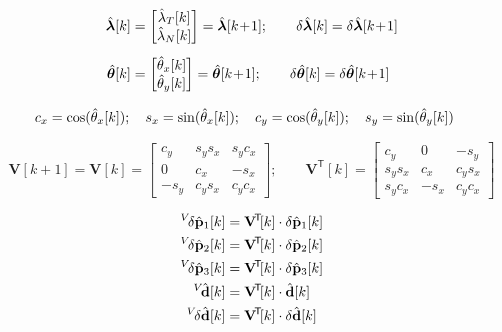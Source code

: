 \documentclass[UTF8,11pt,a4paper]{ctexart}
\newcommand{\tp}{^{\!\mathsf{T}}}
\newcommand{\Vk}{\mathbf{V}[k]}
\newcommand{\VkT}{\mathbf{V}\tp\![k]}
\newcommand{\thhat}[1]{\hat{\theta}_{#1}[k]}    %
\newcommand{\lamhat}[1]{\hat{\lambda}_{#1}[k]}   %
\newcommand{\Vdhat}{{}^V\!\hat{\mathbf{d}}}
\newcommand{\Vddhat}{{}^V\!\delta\hat{\mathbf{d}}}
\begin{document}
\begin{align}
\hat{\bm{\lambda}}[k]
&= \begin{bmatrix}\lamhat{T}\\\lamhat{N}\end{bmatrix}
= \hat{\bm{\lambda}}[k\!+\!1];\qquad
\delta\hat{\bm{\lambda}}[k] = \delta\hat{\bm{\lambda}}[k\!+\!1] \notag\\[4pt]
\hat{\bm{\theta}}[k]
&= \begin{bmatrix}\thhat{x}\\\thhat{y}\end{bmatrix}
= \hat{\bm{\theta}}[k\!+\!1];\qquad
\delta\hat{\bm{\theta}}[k] = \delta\hat{\bm{\theta}}[k\!+\!1] \notag
\end{align}

\begin{align}
c_x &= \cos(\thhat{x});\quad s_x = \sin(\thhat{x});\quad
c_y = \cos(\thhat{y});\quad s_y = \sin(\thhat{y}) \notag
\end{align}

\[
\mathbf{V}[k\!+\!1] = \Vk
= \begin{bmatrix}
c_y & s_y s_x & s_y c_x\\
0 & c_x & -s_x\\
-s_y & c_y s_x & c_y c_x
\end{bmatrix};\qquad
\VkT = \begin{bmatrix}
c_y & 0 & -s_y\\
s_y s_x & c_x & c_y s_x\\
s_y c_x & -s_x & c_y c_x
\end{bmatrix}
\]

\begin{align}
{}^V\!\delta\hat{\mathbf{p}}_1[k] &= \VkT\cdot\delta\hat{\mathbf{p}}_1[k] \notag\\
{}^V\!\delta\hat{\mathbf{p}}_2[k] &= \VkT\cdot\delta\hat{\mathbf{p}}_2[k] \notag\\
{}^V\!\delta\hat{\mathbf{p}}_3[k] &= \VkT\cdot\delta\hat{\mathbf{p}}_3[k] \notag\\
\Vdhat[k] &= \VkT\cdot\hat{\mathbf{d}}[k] \notag\\
\Vddhat[k] &= \VkT\cdot\delta\hat{\mathbf{d}}[k] \notag
\end{align}
\end{document}
